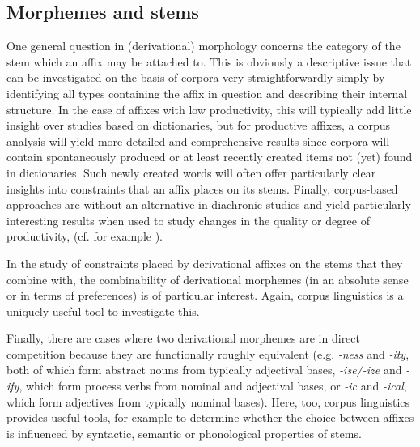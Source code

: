 \subsection{Morphemes and stems}
\label{sec:morphemesandstems}

One general question in (derivational) morphology  concerns the category of the stem  which an affix  may be attached to. This is obviously a descriptive  issue that can be investigated on the basis of corpora very straightforwardly simply by identifying all types  containing the affix  in question and describing their internal structure. In the case of affixes  with low productivity,  this will typically add little insight over studies based on dictionaries,  but for productive affixes,  a corpus analysis will yield more detailed and comprehensive results since corpora will contain spontaneously produced or at least recently created items not (yet) found in dictionaries.  Such newly created words will often offer particularly clear insights into constraints that an affix  places on its stems.  Finally, corpus\hyp{}based approaches are without an alternative in diachronic  studies and yield particularly interesting results when used to study changes in the quality or degree of productivity,  (cf. for example \citealt{dalton-puffer_french_1996}).

In the study of constraints placed by derivational affixes  on the stems  that they combine with, the combinability of derivational morphemes  (in an absolute sense or in terms of preferences) is of particular interest. Again, corpus linguistics is a uniquely useful tool to investigate this.

Finally, there are cases where two derivational morphemes  are in direct competition because they are functionally roughly equivalent (e.g. \textit{-ness} and \textit{-ity}, both of which form abstract nouns  from typically adjectival  bases, \textit{-ise/-ize} and \textit{-ify}, which form process  verbs  from nominal  and adjectival  bases, or \textit{-ic} and \textit{-ical}, which form adjectives  from typically nominal bases). Here, too, corpus linguistics provides useful tools, for example to determine whether the choice between affixes  is influenced by syntactic,  semantic or phonological properties of  stems.

